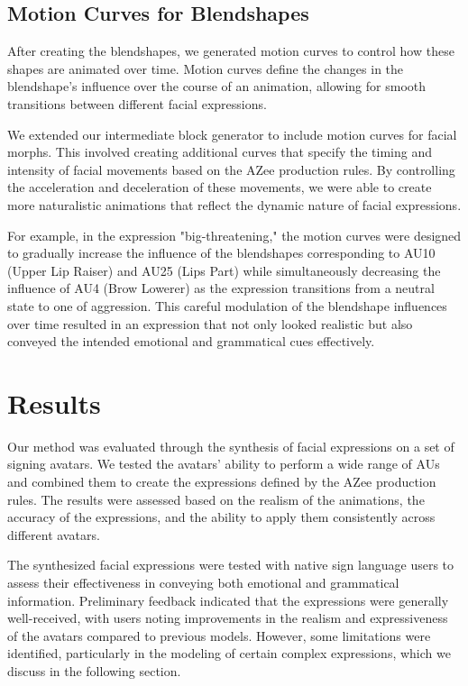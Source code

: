 \documentclass[../../main.tex]{subfiles}
\begin{document}
\subsection{Motion Curves for Blendshapes}

After creating the blendshapes, we generated motion curves to control how these shapes are animated over time. Motion curves define the changes in the blendshape's influence over the course of an animation, allowing for smooth transitions between different facial expressions.

We extended our intermediate block generator to include motion curves for facial morphs. This involved creating additional curves that specify the timing and intensity of facial movements based on the AZee production rules. By controlling the acceleration and deceleration of these movements, we were able to create more naturalistic animations that reflect the dynamic nature of facial expressions.

For example, in the expression "big-threatening," the motion curves were designed to gradually increase the influence of the blendshapes corresponding to AU10 (Upper Lip Raiser) and AU25 (Lips Part) while simultaneously decreasing the influence of AU4 (Brow Lowerer) as the expression transitions from a neutral state to one of aggression. This careful modulation of the blendshape influences over time resulted in an expression that not only looked realistic but also conveyed the intended emotional and grammatical cues effectively.

\section{Results}

Our method was evaluated through the synthesis of facial expressions on a set of signing avatars. We tested the avatars' ability to perform a wide range of AUs and combined them to create the expressions defined by the AZee production rules. The results were assessed based on the realism of the animations, the accuracy of the expressions, and the ability to apply them consistently across different avatars.

The synthesized facial expressions were tested with native sign language users to assess their effectiveness in conveying both emotional and grammatical information. Preliminary feedback indicated that the expressions were generally well-received, with users noting improvements in the realism and expressiveness of the avatars compared to previous models. However, some limitations were identified, particularly in the modeling of certain complex expressions, which we discuss in the following section.
\end{document}
